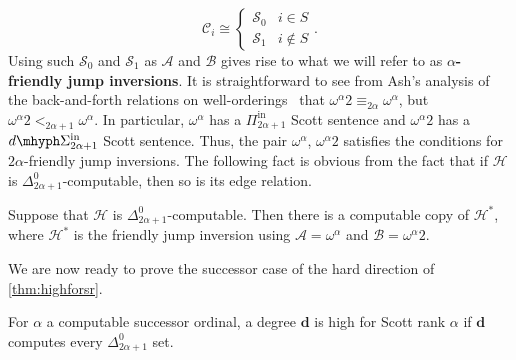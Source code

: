 \documentclass[10pt,a4paper]{amsart}
\newcommand\+[1]{\mathcal{#1}}
\renewcommand\*[1]{\mathbf{#1}}
\renewcommand\=[1]{\text{#1}}
\renewcommand\*[1]{\mathbf{#1}}
\newcommand{\Pinf}[1]{\Pi^{\mathrm{in}}_{#1}}
\newcommand{\dSinf}[1]{d\mhyph\Sigma^{\mathrm{in}}_{#1}}
\newcommand{\define}[1]{\textbf{#1}}
\begin{document}
       \[ \+C_i\cong \begin{cases} \+S_0 & i\in S\\
                                   \+S_1 & i\not\in S
   \end{cases}.\]
   Using such $\+S_0$ and $\+S_1$ as $\+A$ and $\+B$ gives rise to what we will refer to as \define{$\alpha$-friendly jump inversions}.
   It is straightforward to see from Ash's analysis of the back-and-forth relations on well-orderings~\cite{ash1986} that $\omega^\alpha2 \equiv_{2\alpha} \omega^\alpha$, but $\omega^\alpha2<_{2\alpha+1}\omega^\alpha $. In particular, $\omega^\alpha$ has a $\Pinf{2\alpha+1}$ Scott sentence and $\omega^\alpha2$ has a $\dSinf{2\alpha+1}$ Scott sentence. Thus, the pair $\omega^\alpha$, $\omega^\alpha2$ satisfies the conditions for $2\alpha$-friendly jump inversions. The following fact is obvious from the fact that if $\+H$ is $\Delta^0_{2\alpha+1}$-computable, then so is its edge relation.
   \begin{lemma}\label{claim:jumpinversion}
     Suppose that $\+H$ is $\Delta^0_{2\alpha+1}$-computable. Then there is a computable copy of $\+H^*$, where $\+H^*$ is the friendly jump inversion using $\+A=\omega^\alpha$ and $\+B=\omega^\alpha2$.
   \end{lemma}
   We are now ready to prove the successor case of the hard direction of \cref{thm:highforsr}.
 \begin{lemma}\label{lem:highforsrsucc}
   For $\alpha$ a computable successor ordinal, a degree $\*d$ is high for Scott rank $\alpha$ if $\*d$ computes every $\Delta^0_{2\alpha+1}$ set.
 \end{lemma}
\end{document}
